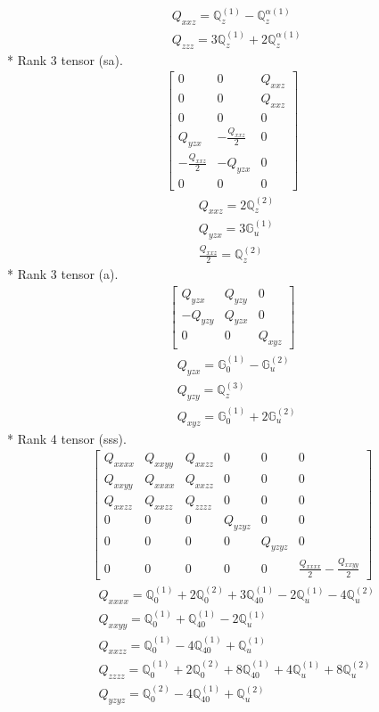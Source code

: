 \documentclass[fleqn,8pt,landscape]{jsarticle}
\begin{document}
\begin{align*}
& Q_{xxz} = \mathbb{Q}_{z}^{(1)} - \mathbb{Q}_{z}^{\alpha(1)} \\
& Q_{zzz} = 3 \mathbb{Q}_{z}^{(1)} + 2 \mathbb{Q}_{z}^{\alpha(1)}
\end{align*}
* Rank 3 tensor (sa).
\begin{align*}
\begin{bmatrix} 0 & 0 & Q_{xxz} \\ 0 & 0 & Q_{xxz} \\ 0 & 0 & 0 \\ Q_{yzx} & - \frac{Q_{xxz}}{2} & 0 \\ - \frac{Q_{xxz}}{2} & - Q_{yzx} & 0 \\ 0 & 0 & 0 \end{bmatrix}
\end{align*}
\begin{align*}
& Q_{xxz} = 2 \mathbb{Q}_{z}^{(2)} \\
& Q_{yzx} = 3 \mathbb{G}_{u}^{(1)} \\
& \frac{Q_{xxz}}{2} = \mathbb{Q}_{z}^{(2)}
\end{align*}
* Rank 3 tensor (a).
\begin{align*}
\begin{bmatrix} Q_{yzx} & Q_{yzy} & 0 \\ - Q_{yzy} & Q_{yzx} & 0 \\ 0 & 0 & Q_{xyz} \end{bmatrix}
\end{align*}
\begin{align*}
& Q_{yzx} = \mathbb{G}_{0}^{(1)} - \mathbb{G}_{u}^{(2)} \\
& Q_{yzy} = \mathbb{Q}_{z}^{(3)} \\
& Q_{xyz} = \mathbb{G}_{0}^{(1)} + 2 \mathbb{G}_{u}^{(2)}
\end{align*}
* Rank 4 tensor (sss).
\begin{align*}
\begin{bmatrix} Q_{xxxx} & Q_{xxyy} & Q_{xxzz} & 0 & 0 & 0 \\ Q_{xxyy} & Q_{xxxx} & Q_{xxzz} & 0 & 0 & 0 \\ Q_{xxzz} & Q_{xxzz} & Q_{zzzz} & 0 & 0 & 0 \\ 0 & 0 & 0 & Q_{yzyz} & 0 & 0 \\ 0 & 0 & 0 & 0 & Q_{yzyz} & 0 \\ 0 & 0 & 0 & 0 & 0 & \frac{Q_{xxxx}}{2} - \frac{Q_{xxyy}}{2} \end{bmatrix}
\end{align*}
\begin{align*}
& Q_{xxxx} = \mathbb{Q}_{0}^{(1)} + 2 \mathbb{Q}_{0}^{(2)} + 3 \mathbb{Q}_{40}^{(1)} - 2 \mathbb{Q}_{u}^{(1)} - 4 \mathbb{Q}_{u}^{(2)} \\
& Q_{xxyy} = \mathbb{Q}_{0}^{(1)} + \mathbb{Q}_{40}^{(1)} - 2 \mathbb{Q}_{u}^{(1)} \\
& Q_{xxzz} = \mathbb{Q}_{0}^{(1)} - 4 \mathbb{Q}_{40}^{(1)} + \mathbb{Q}_{u}^{(1)} \\
& Q_{zzzz} = \mathbb{Q}_{0}^{(1)} + 2 \mathbb{Q}_{0}^{(2)} + 8 \mathbb{Q}_{40}^{(1)} + 4 \mathbb{Q}_{u}^{(1)} + 8 \mathbb{Q}_{u}^{(2)} \\
& Q_{yzyz} = \mathbb{Q}_{0}^{(2)} - 4 \mathbb{Q}_{40}^{(1)} + \mathbb{Q}_{u}^{(2)}
\end{align*}
\end{document}

